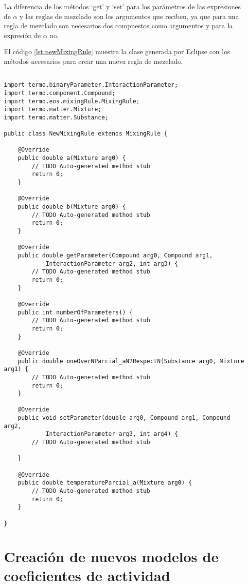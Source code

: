 	La diferencia de los métodos `get' y `set' para los parámetros de las expresiones de $\alpha$ y las reglas de mezclado son los argumentos que reciben, ya que para una regla de mezclado son necesarios dos compuestos como argumentos y para la expresión de $\alpha$ no.

	El código \ref{lst:newMixingRule} muestra la clase generada por Eclipse con los métodos necesarios para crear una nueva regla de mezclado.

	\begin{lstlisting}[caption={Esqueleto para la creación de una nueva regla de mezclado},label={lst:newMixingRule}]

import termo.binaryParameter.InteractionParameter;
import termo.component.Compound;
import termo.eos.mixingRule.MixingRule;
import termo.matter.Mixture;
import termo.matter.Substance;

public class NewMixingRule extends MixingRule {

	@Override
	public double a(Mixture arg0) {
		// TODO Auto-generated method stub
		return 0;
	}

	@Override
	public double b(Mixture arg0) {
		// TODO Auto-generated method stub
		return 0;
	}

	@Override
	public double getParameter(Compound arg0, Compound arg1,
			InteractionParameter arg2, int arg3) {
		// TODO Auto-generated method stub
		return 0;
	}

	@Override
	public int numberOfParameters() {
		// TODO Auto-generated method stub
		return 0;
	}

	@Override
	public double oneOverNParcial_aN2RespectN(Substance arg0, Mixture arg1) {
		// TODO Auto-generated method stub
		return 0;
	}

	@Override
	public void setParameter(double arg0, Compound arg1, Compound arg2,
			InteractionParameter arg3, int arg4) {
		// TODO Auto-generated method stub

	}

	@Override
	public double temperatureParcial_a(Mixture arg0) {
		// TODO Auto-generated method stub
		return 0;
	}

}

	\end{lstlisting}

\section{Creación de nuevos modelos de coeficientes de actividad}\label{sec:newActivityModels}

